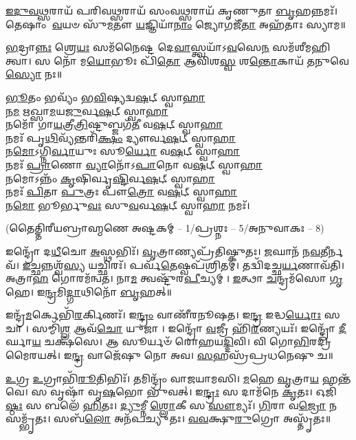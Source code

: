 \-\ul{𑌇}\-\-\ul{𑌦𑍁}\-\-\ul{𑌵}\-\-\ul{𑌥𑍍𑌸}\-𑌰𑌾𑌯᳴ 𑌪𑌰𑌿𑌵\-\ul{𑌥𑍍𑌸}\-𑌰𑌾𑌯᳴ 𑌸𑌂𑌵\-\ul{𑌥𑍍𑌸}\-𑌰𑌾𑌯᳴ 𑌕𑍃𑌣𑍁𑌤𑌾 \ul{𑌬𑍃}\-𑌹𑌨𑍍𑌨𑌮𑌃᳴।
𑌤𑍇𑌷𑌾𑌂 \ul{𑌵}\-𑌯𑍞 𑌸𑍁᳴\-\ul{𑌮}\-𑌤𑍗 \ul{𑌯}\-𑌜𑍍𑌞𑌿𑌯𑌾᳴\-\ul{𑌨𑌾𑌂} 𑌜𑍍𑌯𑍋𑌗𑌜𑍀᳴\-\ul{𑌤𑌾} 𑌅𑌹᳴𑌤𑌾𑌃 𑌸𑍍𑌯𑌾𑌮॥

\-\ul{𑌭}\-𑌦𑍍𑌰𑌾\-\ul{𑌨𑍍𑌨𑌃} 𑌶𑍍𑌰𑍇\-\ul{𑌯𑌃} 𑌸𑌮᳴𑌨𑍈𑌷𑍍𑌟 𑌦𑍇\-\ul{𑌵𑌾}\-𑌸𑍍𑌤𑍍𑌵𑌯𑌾᳴𑌽\-\ul{𑌵}\-𑌸𑍇\-\ul{𑌨} 𑌸𑌮᳴𑌶𑍀𑌮𑌹𑌿 𑌤𑍍𑌵𑌾।
𑌸 𑌨𑍋᳴ 𑌮\-\ul{𑌯𑍋}\-𑌭𑍂𑌃 𑌪𑌿᳴\-\ul{𑌤𑍋} 𑌆𑌵𑌿᳴𑌶\-\ul{𑌸𑍍𑌵} 𑌶\-\ul{𑌨𑍍𑌤𑍋}\-𑌕𑌾𑌯᳴ \ul{𑌤}\-𑌨𑍁𑌵𑍇 \ul{𑌸𑍍𑌯𑍋} 𑌨𑌃॥

\-\ul{𑌭𑍂}\-𑌤𑌂 𑌭𑌵𑍍𑌯𑌂᳴ 𑌭\-\ul{𑌵𑌿}\-𑌷𑍍𑌯𑌦𑍍𑌵\-\ul{𑌷}\-𑌟𑍍 𑌸𑍍𑌵𑌾\-\ul{𑌹𑌾}\-\\
𑌨\-\ul{𑌮} 𑌋𑌖𑍍𑌸𑌾\-\ul{𑌮}\-𑌯\-\ul{𑌜𑍁}\-𑌰𑍍𑌵\-\ul{𑌷}\-𑌟𑍍 𑌸𑍍𑌵𑌾\-\ul{𑌹𑌾}\-\\
𑌨𑌮𑍋᳴ 𑌗𑌾\-\ul{𑌯}\-𑌤𑍍𑌰𑍀\-\ul{𑌤𑍍𑌰𑌿}\-𑌷𑍍𑌟𑍁𑌬𑍍𑌜𑌗᳴\-\ul{𑌤𑍀} 𑌵\-\ul{𑌷}\-𑌟𑍍 𑌸𑍍𑌵𑌾\-\ul{𑌹𑌾}\-\\
𑌨𑌮𑌃᳴ 𑌪𑍃\-\ul{𑌥𑌿}\-𑌵𑍍𑌯᳴𑌨𑍍𑌤𑌰𑌿᳴\-\ul{𑌕𑍍𑌷𑌂} 𑌦𑍍𑌯𑍗𑌰𑍍𑌵\-\ul{𑌷}\-𑌟𑍍 𑌸𑍍𑌵𑌾\-\ul{𑌹𑌾}\-\\
𑌨\-\ul{𑌮𑍋}\-𑌽𑌗𑍍𑌨𑌿\-\ul{𑌰𑍍𑌵𑌾}\-𑌯𑍁𑌃 𑌸𑍂\-\ul{𑌰𑍍𑌯𑍋} 𑌵\-\ul{𑌷}\-𑌟𑍍 𑌸𑍍𑌵𑌾\-\ul{𑌹𑌾}\-\\
𑌨𑌮𑌃᳴ \ul{𑌪𑍍𑌰𑌾}\-𑌣𑍋 \ul{𑌵𑍍𑌯𑌾}\-𑌨𑍋᳴𑌽\-\ul{𑌪𑌾}\-𑌨𑍋 𑌵\-\ul{𑌷}\-𑌟𑍍 𑌸𑍍𑌵𑌾\-\ul{𑌹𑌾}\-\\
𑌨𑌮𑍋𑌽𑌨𑍍𑌨𑌂᳴ \ul{𑌕𑍃}\-𑌷𑌿𑌰𑍍𑌵𑍃\-\ul{𑌷𑍍𑌟𑌿}\-𑌰𑍍𑌵\-\ul{𑌷}\-𑌟𑍍 𑌸𑍍𑌵𑌾\-\ul{𑌹𑌾}\-\\
𑌨𑌮𑌃᳴ \ul{𑌪𑌿}\-𑌤𑌾 \ul{𑌪𑍁}\-𑌤𑍍𑌰𑌃 𑌪𑍗\-\ul{𑌤𑍍𑌰𑍋} 𑌵\-\ul{𑌷}\-𑌟𑍍 𑌸𑍍𑌵𑌾\-\ul{𑌹𑌾}\-\\
𑌨\-\ul{𑌮𑍋} 𑌭𑍂𑌰𑍍𑌭𑍁\-\ul{𑌵𑌃} 𑌸𑍁\-\ul{𑌵}\-𑌰𑍍𑌵\-\ul{𑌷}\-𑌟𑍍 𑌸𑍍𑌵𑌾\-\ul{𑌹𑌾} 𑌨𑌮𑌃᳴।

\centerline{\scriptsize (𑌤𑍈𑌤𑍍𑌤𑌿𑌰𑍀𑌯𑌬𑍍𑌰𑌾𑌹𑍍𑌮𑌣𑍇 𑌅𑌷𑍍𑌟𑌕𑌮𑍍 – 1/𑌪𑍍𑌰𑌶𑍍𑌨𑌃 – 5/𑌅𑌨𑍁𑌵𑌾𑌕𑌃 – 8)}

𑌇𑌨𑍍𑌦𑍍𑌰𑍋᳴ 𑌦\-\ul{𑌧𑍀}\-𑌚𑍋 \ul{𑌅}\-𑌸𑍍𑌥𑌭𑌿𑌃᳴।
\-\ul{𑌵𑍃}\-𑌤𑍍𑌰𑌾𑌣𑍍𑌯𑌪𑍍𑌰᳴𑌤𑌿𑌷𑍍𑌕𑍁𑌤𑌃।
\-\ul{𑌜}\-𑌘𑌾𑌨᳴ 𑌨\-\ul{𑌵}\-𑌤𑍀𑌰𑍍𑌨𑌵᳴।
\-\ul{𑌇}\-𑌚𑍍𑌛𑌨𑍍𑌨𑌶𑍍𑌵᳴\-\ul{𑌸𑍍𑌯} 𑌯𑌚𑍍𑌛𑌿𑌰𑌃᳴।
𑌪𑌰𑍍𑌵᳴\-\ul{𑌤𑍇}\-𑌷𑍍𑌵𑌪᳴𑌶𑍍𑌰𑌿𑌤𑌮𑍍।
𑌤𑌦𑍍𑌵𑌿᳴𑌦𑌚𑍍𑌛\-\ul{𑌰𑍍𑌯}\-𑌣𑌾𑌵᳴𑌤𑌿।
𑌅𑌤𑍍𑌰𑌾\-\ul{𑌹} 𑌗𑍋𑌰𑌮᳴𑌨𑍍𑌵𑌤।
𑌨𑌾\-\ul{𑌮} 𑌤𑍍𑌵𑌷𑍍𑌟𑍁᳴𑌰\-\ul{𑌪𑍀}\-𑌚𑍍𑌯𑌮𑍍।
\-\ul{𑌇}\-𑌤𑍍𑌥𑌾 \ul{𑌚}\-𑌨𑍍𑌦𑍍𑌰𑌮᳴𑌸𑍋 \ul{𑌗𑍃}\-𑌹𑍇।
𑌇\-\ul{𑌨𑍍𑌦𑍍𑌰}\-𑌮𑌿\-\ul{𑌦𑍍𑌗𑌾}\-𑌥𑌿𑌨𑍋᳴ \ul{𑌬𑍃}\-𑌹𑌤𑍍॥

𑌇𑌨𑍍𑌦𑍍𑌰᳴\-\ul{𑌮}\-𑌰𑍍𑌕𑍇𑌭𑌿᳴\-\ul{𑌰}\-𑌰𑍍𑌕𑌿𑌣𑌃᳴।
𑌇\-\ul{𑌨𑍍𑌦𑍍𑌰𑌂} 𑌵𑌾𑌣𑍀᳴𑌰𑌨𑍂𑌷𑌤।
𑌇\-\ul{𑌨𑍍𑌦𑍍𑌰} 𑌇𑌦𑍍𑌧\-\ul{𑌰𑍍𑌯𑍋𑌃} 𑌸𑌚𑌾।
𑌸𑌮𑍍𑌮𑌿᳴\-\ul{𑌶𑍍𑌲} 𑌆𑌵᳴\-\ul{𑌚𑍋} 𑌯𑍁𑌜𑌾।
𑌇𑌨𑍍𑌦𑍍𑌰𑍋᳴ \ul{𑌵}\-𑌜𑍍𑌰𑍀 𑌹𑌿᳴\-\ul{𑌰}\-𑌣𑍍𑌯𑌯𑌃᳴।
𑌇𑌨𑍍𑌦𑍍𑌰𑍋᳴ \ul{𑌦𑍀}\-𑌰𑍍𑌘𑌾\-\ul{𑌯} 𑌚𑌕𑍍𑌷᳴𑌸𑍇।
𑌆 𑌸𑍂𑌰𑍍𑌯𑍞᳴ 𑌰𑍋𑌹𑌯\-\ul{𑌦𑍍𑌦𑌿}\-𑌵𑌿।
𑌵𑌿 𑌗𑍋\-\ul{𑌭𑌿}\-𑌰𑌦𑍍𑌰𑌿᳴𑌮𑍈𑌰𑌯𑌤𑍍।
𑌇\-\ul{𑌨𑍍𑌦𑍍𑌰} 𑌵𑌾𑌜𑍇᳴𑌷𑍁 𑌨𑍋 𑌅𑌵।
\-\ul{𑌸}\-𑌹𑌸𑍍𑌰᳴𑌪𑍍𑌰𑌧𑌨𑍇𑌷𑍁 𑌚॥

\-\ul{𑌉}\-𑌗𑍍𑌰 \ul{𑌉}\-𑌗𑍍𑌰𑌾𑌭𑌿᳴\-\ul{𑌰𑍂}\-𑌤𑌿𑌭𑌿𑌃᳴।
𑌤𑌮𑌿𑌨𑍍𑌦𑍍𑌰𑌂᳴ 𑌵𑌾𑌜𑌯𑌾𑌮𑌸𑌿।
\-\ul{𑌮}\-𑌹𑍇 \ul{𑌵𑍃}\-𑌤𑍍𑌰𑌾\-\ul{𑌯} 𑌹𑌨𑍍𑌤᳴𑌵𑍇।
𑌸 𑌵𑍃𑌷𑌾᳴ 𑌵𑍃\-\ul{𑌷}\-𑌭𑍋 𑌭𑍁᳴𑌵𑌤𑍍।
𑌇\-\ul{𑌨𑍍𑌦𑍍𑌰𑌃} 𑌸 𑌦𑌾𑌮᳴𑌨𑍇 \ul{𑌕𑍃}\-𑌤𑌃।
𑌓𑌜𑌿᳴\-\ul{𑌷𑍍𑌠𑌃} 𑌸 𑌬𑌲𑍇᳴ \ul{𑌹𑌿}\-𑌤𑌃।
\-\ul{𑌦𑍍𑌯𑍁}\-𑌮𑍍𑌨𑍀 \ul{𑌶𑍍𑌲𑍋}\-𑌕𑍀 𑌸 \ul{𑌸𑍗}\-𑌮𑍍𑌯𑌃᳴।
\-\ul{𑌗𑌿}\-𑌰𑌾 𑌵\-\ul{𑌜𑍍𑌰𑍋} 𑌨 𑌸𑌮𑍍𑌭𑍃᳴𑌤𑌃।
𑌸𑌬᳴\-\ul{𑌲𑍋} 𑌅𑌨᳴𑌪𑌚𑍍𑌯𑍁𑌤𑌃।
\-\ul{𑌵}\-\-\ul{𑌵}\-𑌕𑍍𑌷𑍁\-\ul{𑌰𑍁}\-𑌗𑍍𑌰𑍋 𑌅𑌸𑍍𑌤𑍃᳴𑌤𑌃॥

